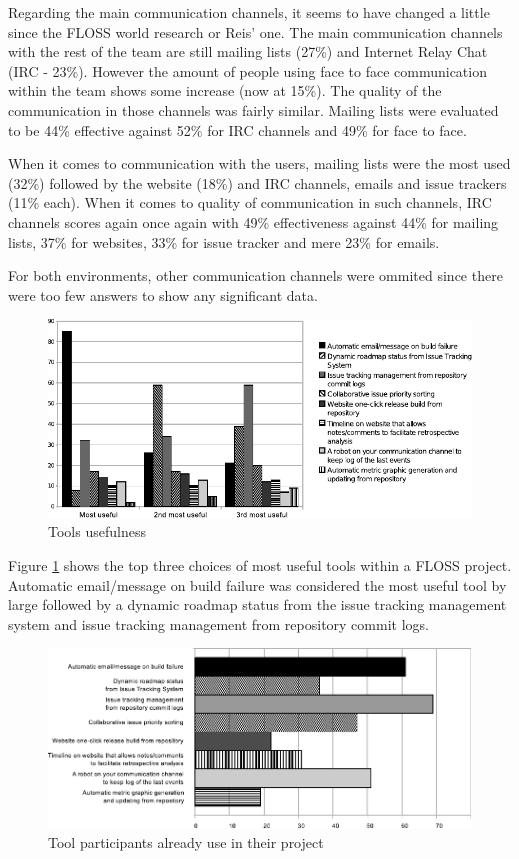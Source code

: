 \documentclass[lnbip]{svmultln}
\begin{document}
Regarding the main communication channels, it seems to have changed a
little since the FLOSS world research or Reis' one. The main
communication channels with the rest of the team are still mailing
lists (27\%) and Internet Relay Chat (IRC - 23\%). However the amount
of people using face to face communication within the team shows some
increase (now at 15\%). The quality of the communication in those
channels was fairly similar. Mailing lists were evaluated to be 44\%
effective against 52\% for IRC channels and 49\% for face to face.

When it comes to communication with the users, mailing lists were the
most used (32\%) followed by the website (18\%) and IRC channels,
emails and issue trackers (11\% each). When it comes to quality of
communication in such channels, IRC channels scores again once again
with 49\% effectiveness against 44\% for mailing lists, 37\% for
websites, 33\% for issue tracker and mere 23\% for emails.

For both environments, other communication channels were ommited since
there were too few answers to show any significant data.

\begin{figure}[htb]
  \centering
  \includegraphics{floss-tools.pdf}
  \caption{Tools usefulness}
  \label{fig:floss-tools}
\end{figure}

Figure \ref{fig:floss-tools} shows the top three choices of most
useful tools within a FLOSS project. Automatic email/message on build
failure was considered the most useful tool by large followed by a
dynamic roadmap status from the issue tracking management system and
issue tracking management from repository commit logs.

\begin{figure}[hbt]
  \centering
  \includegraphics[scale=.8]{floss-existingtools.pdf}
  \caption{Tool participants already use in their project}
  \label{fig:floss-existingtools}
\end{figure}
\end{document}
